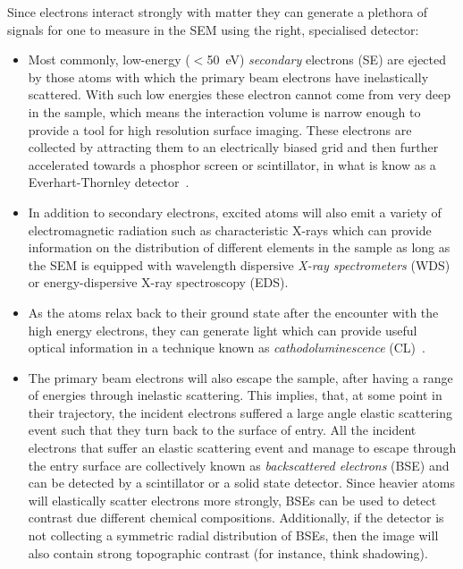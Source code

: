 Since electrons interact strongly with matter they can generate a plethora of signals for one to measure in the SEM using the right, specialised detector:
\begin{itemize}
    \item Most commonly, low-energy ($<$\SI{50}{\electronvolt}) \textit{secondary} electrons (SE) are ejected by those atoms with which the primary beam electrons have inelastically scattered. With such low energies these electron cannot come from very deep in the sample, which means the interaction volume is narrow enough to provide a tool for high resolution surface imaging. These electrons are collected by attracting them to an electrically biased grid and then further accelerated towards a phosphor screen or scintillator, in what is know as a Everhart-Thornley detector~\cite{ETdetector}.
    
    
    
    \item In addition to secondary electrons, excited atoms will also emit a variety of electromagnetic radiation such as characteristic X-rays which can provide information on the distribution of different elements in the sample as long as the SEM is equipped with wavelength dispersive \textit{X-ray spectrometers} (WDS) or energy-dispersive X-ray spectroscopy (EDS). 
    
    \item As the atoms relax back to their ground state after the encounter with the high energy electrons, they can generate light which can provide useful optical information in a technique known as \textit{cathodoluminescence} (CL)~\cite{Paul11}.
    
    \item The primary beam electrons will also escape the sample, after having a range of energies through inelastic scattering. This implies, that, at some point in their trajectory, the incident electrons suffered a large angle elastic scattering event such that they turn back to the surface of entry. All the incident electrons that suffer an elastic scattering event and manage to escape through the entry surface are collectively known as \textit{backscattered electrons} (BSE) and can be detected by a scintillator or a solid state detector. Since heavier atoms will elastically scatter electrons more strongly, BSEs can be used to detect contrast due different chemical compositions. Additionally, if the detector is not collecting a symmetric radial distribution of BSEs, then the image will also contain strong topographic contrast (for instance, think shadowing). 
    

\end{itemize}
